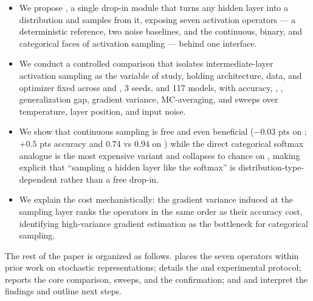 \begin{itemize}[leftmargin=*,itemsep=0pt,topsep=0pt]
  \item We propose \samplinglayer, a single drop-in module that turns any hidden layer into a distribution and samples from it, exposing seven activation operators --- a deterministic reference, two noise baselines, and the continuous, binary, and categorical faces of activation sampling --- behind one interface.
  \item We conduct a controlled comparison that isolates intermediate-layer activation sampling as the variable of study, holding architecture, data, and optimizer fixed across \mnist{} and \cifar{}, 3 seeds, and 117 models, with accuracy, \nll, \ece, generalization gap, gradient variance, MC-averaging, and sweeps over temperature, layer position, and input noise.
  \item We show that continuous \gaussreparam{} sampling is free and even beneficial ($-0.03$ pts on \mnist; $+0.5$ pts accuracy and $0.74$ vs $0.94$ \nll{} on \cifar) while the direct categorical softmax analogue is the most expensive variant and collapses to chance on \cifar, making explicit that ``sampling a hidden layer like the softmax'' is distribution-type-dependent rather than a free drop-in.
  \item We explain the cost mechanistically: the gradient variance induced at the sampling layer ranks the operators in the same order as their accuracy cost, identifying high-variance gradient estimation as the bottleneck for categorical sampling.
\end{itemize}

The rest of the paper is organized as follows.  places the seven operators within prior work on stochastic representations;  details the \samplinglayer{} and experimental protocol;  reports the core comparison, sweeps, and the \cifar{} confirmation; and  and  interpret the findings and outline next steps.
